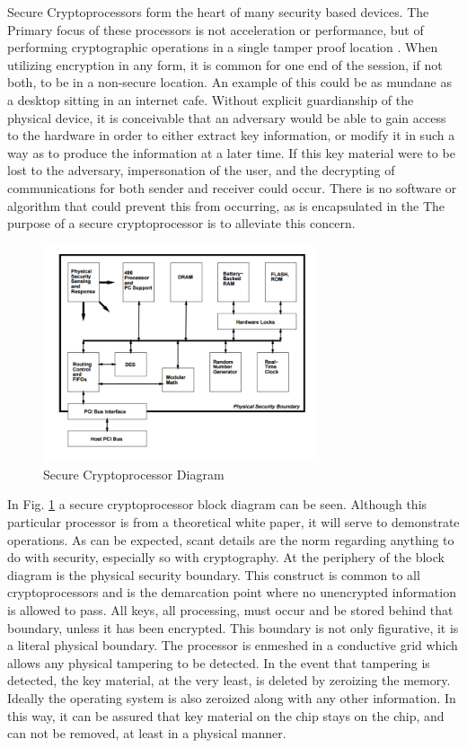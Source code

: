 \documentclass[journal]{IEEEtran}
\begin{document}
Secure Cryptoprocessors form the heart of many security based devices.  The Primary focus of these processors is not acceleration or performance, but of performing cryptographic operations in a single tamper proof location \cite{coprocesserWhitePaper}.  When utilizing encryption in any form, it is common for one end of the session, if not both, to be in a non-secure location.  An example of this could be as mundane as a desktop sitting in an internet cafe.  Without explicit guardianship of the physical device, it is conceivable that an adversary would be able to gain access to the hardware in order to either extract key information, or modify it in such a way as to produce the information at a later time.  If this key material were to be lost to the adversary, impersonation of the user, and the decrypting of communications for both sender and receiver could occur.  There is no software or algorithm that could prevent this from occurring, as is encapsulated in the The purpose of a secure cryptoprocessor is to alleviate this concern.  

\begin{figure}[htbp]
	\centering
	\includegraphics[width=8cm,keepaspectratio]{img/coprocessorDiagram.png}
	\caption{Secure Cryptoprocessor Diagram \cite{coprocesserWhitePaper} }
	\label{coprocessorDiagram}
\end{figure}

In Fig. \ref{coprocessorDiagram} a secure cryptoprocessor block diagram can be seen.  Although this particular processor is from a theoretical white paper, it will serve to demonstrate operations.  As can be expected, scant details are the norm regarding anything to do with security, especially so with cryptography.  At the periphery of the block diagram is the physical security boundary.  This construct is common to all cryptoprocessors and is the demarcation point where no unencrypted information is allowed to pass.  All keys, all processing, must occur and be stored behind that boundary, unless it has been encrypted.  This boundary is not only figurative, it is a literal physical boundary.  The processor is enmeshed in a conductive grid \cite{coprocesserWhitePaper} which allows any physical tampering to be detected.  In the event that tampering is detected, the key material, at the very least, is deleted by zeroizing the memory.  Ideally the operating system is also zeroized along with any other information.  In this way, it can be assured that key material on the chip stays on the chip, and can not be removed, at least in a physical manner.
\end{document}
